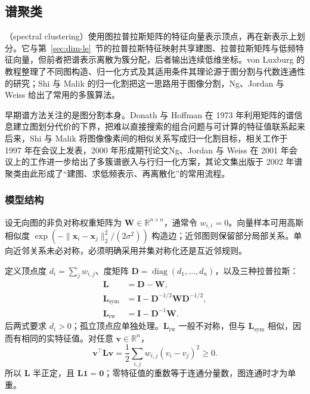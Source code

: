 \subsection{谱聚类}
\label{sec:clustering-spectral}

（spectral clustering）使用图拉普拉斯矩阵的特征向量表示顶点，再在新表示上划分。它与第~\ref{sec:dim-le}~节的拉普拉斯特征映射共享建图、拉普拉斯矩阵与低频特征向量，但前者把谱表示离散为簇分配，后者输出连续低维坐标。von Luxburg 的教程整理了不同图构造、归一化方式及其适用条件其理论源于图分割与代数连通性的研究；Shi 与 Malik 的归一化割把这一思路用于图像分割，Ng、Jordan 与 Weiss 给出了常用的多簇算法。

早期谱方法关注的是图分割本身。Donath 与 Hoffman 在 1973 年利用矩阵的谱信息建立图划分代价的下界，把难以直接搜索的组合问题与可计算的特征值联系起来后来，Shi 与 Malik 将图像像素间的相似关系写成归一化割目标，相关工作于 1997 年在会议上发表，2000 年形成期刊论文Ng、Jordan 与 Weiss 在 2001 年会议上的工作进一步给出了多簇谱嵌入与行归一化方案，其论文集出版于 2002 年谱聚类由此形成了“建图、求低频表示、再离散化”的常用流程。

\subsubsection{模型结构}

设无向图的非负对称权重矩阵为 $\bm{W}\in\mathbb{R}^{n\times n}$，通常令 $w_{i,i}=0$。向量样本可用高斯相似度 $\exp(-\lVert\bm{x}_i-\bm{x}_j\rVert_2^2/(2\sigma^2))$ 构造边；近邻图则保留部分局部关系。单向近邻关系未必对称，必须明确采用并集对称化还是互近邻规则。

定义顶点度 $d_i=\sum_jw_{i,j}$、度矩阵 $\bm{D}=\operatorname{diag}(d_1,\ldots,d_n)$，以及三种拉普拉斯：
\begin{align}
 \bm{L}&=\bm{D}-\bm{W},\nonumber\\
 \bm{L}_{\mathrm{sym}}
 &=\bm{I}-\bm{D}^{-1/2}\bm{W}\bm{D}^{-1/2},\nonumber\\
 \bm{L}_{\mathrm{rw}}
 &=\bm{I}-\bm{D}^{-1}\bm{W}.
 \label{eq:clustering-laplacians}
\end{align}
后两式要求 $d_i>0$；孤立顶点应单独处理。$\bm{L}_{\mathrm{rw}}$ 一般不对称，但与 $\bm{L}_{\mathrm{sym}}$ 相似，因而有相同的实特征值。对任意 $\bm{v}\in\mathbb{R}^n$，
\begin{equation}
 \bm{v}^{\top}\bm{L}\bm{v}
 =\frac12\sum_{i,j}w_{i,j}(v_i-v_j)^2\geq0.
 \label{eq:clustering-laplacian-form}
\end{equation}
所以 $\bm{L}$ 半正定，且 $\bm{L}\bm{1}=\bm{0}$；零特征值的重数等于连通分量数，图连通时才为单重。

